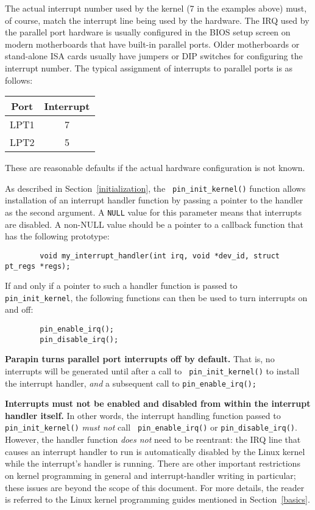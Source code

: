 \documentclass{article}
\begin{document}
The actual interrupt number used by the kernel (7 in the examples
above) must, of course, match the interrupt line being used by the
hardware.  The IRQ used by the parallel port hardware is usually
configured in the BIOS setup screen on modern motherboards that have
built-in parallel ports.  Older motherboards or stand-alone ISA cards
usually have jumpers or DIP switches for configuring the interrupt
number.  The typical assignment of interrupts to parallel ports is as
follows:

\begin{center}
\begin{tabular}{|c|c|}
\hline
Port & Interrupt \\
\hline
LPT1 & 7 \\
\hline
LPT2 & 5 \\
\hline
\end{tabular}
\end{center}

These are reasonable defaults if the actual hardware configuration is
not known.

As described in Section~\ref{initialization}, the {\tt
pin\_init\_kernel()} function allows installation of an interrupt
handler function by passing a pointer to the handler as the second
argument.  A {\tt NULL} value for this parameter means that interrupts
are disabled.  A non-NULL value should be a pointer to a callback
function that has the following prototype:

\begin{verbatim}
        void my_interrupt_handler(int irq, void *dev_id, struct pt_regs *regs);
\end{verbatim}

If and only if a pointer to such a handler function is passed to {\tt
pin\_init\_kernel}, the following functions can then be used to turn
interrupts on and off:
\begin{verbatim}
        pin_enable_irq();
        pin_disable_irq();
\end{verbatim}

{\bf Parapin turns parallel port interrupts off by default.}  That is,
no interrupts will be generated until after a call to {\tt
pin\_init\_kernel()} to install the interrupt handler, {\em and} a
subsequent call to {\tt pin\_enable\_irq();}

{\bf Interrupts must not be enabled and disabled from within the
interrupt handler itself.}  In other words, the interrupt handling
function passed to {\tt pin\_init\_kernel()} {\em must not} call {\tt
pin\_enable\_irq()} or {\tt pin\_disable\_irq()}.  However, the
handler function {\em does not} need to be reentrant: the IRQ line
that causes an interrupt handler to run is automatically disabled by
the Linux kernel while the interrupt's handler is running.  There are
other important restrictions on kernel programming in general and
interrupt-handler writing in particular; these issues are beyond the
scope of this document.  For more details, the reader is referred to
the Linux kernel programming guides mentioned in Section~\ref{basics}.
\end{document}
